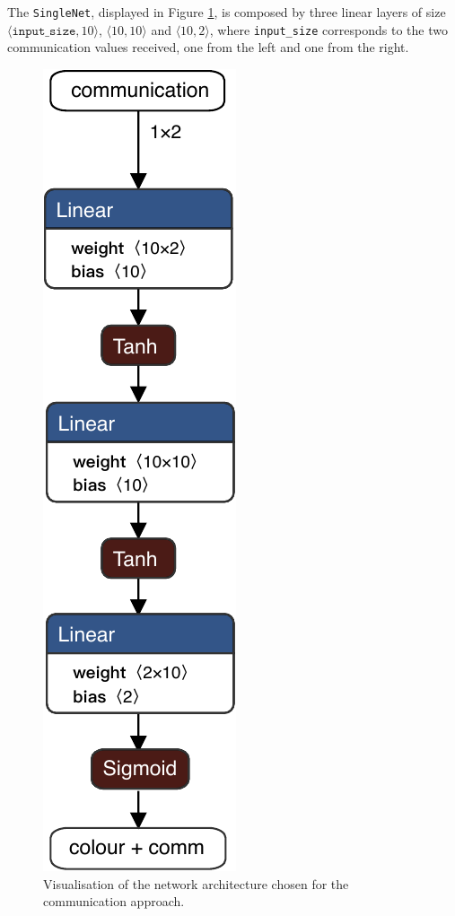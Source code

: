 The \texttt{SingleNet}, displayed in Figure \ref{fig:singlenetcomm2}, is composed 
by three linear layers of size $\langle \mathtt{input\_size}, 10\rangle$,  $\langle 
10, 10\rangle$ and $\langle 10, 2\rangle$, where \texttt{input\_size} 
corresponds to the two communication values received, one from the left and one 
from the right.
\begin{figure}[!htb]
	\centering
	\includegraphics[width=.14\textwidth]{contents/images/task2allcomm}
	\caption[Network architectures for the communication approach.]{Visualisation 
		of the network architecture chosen for the 
		communication approach.}
	\label{fig:singlenetcomm2}
\end{figure}


